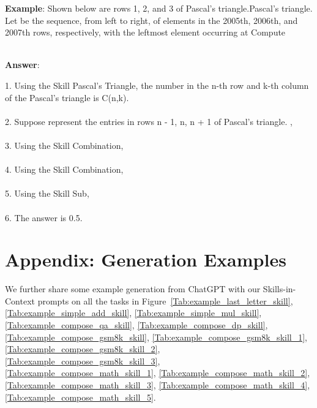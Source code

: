 \documentclass{article} \usepackage{arxiv}
\begin{document}
\begin{tcolorbox}[title = {An Example of Skill Composition for MATH}, colback = Apricot!25!white, colframe = BrickRed!75!black] 
\textbf{Example}: Shown below are rows 1, 2, and 3 of Pascal's triangle.Pascal's triangle. Let    be the sequence, from left to right, of elements in the 2005th, 2006th, and 2007th rows, respectively, with the leftmost element occurring at   Compute  \\ \\
 \quad

\textbf{Answer}:

1. Using the Skill Pascal's Triangle, the number in the n-th row and k-th column of the Pascal's triangle is C(n,k). \\ \\
2. Suppose  represent the entries in rows n - 1, n, n + 1 of Pascal's triangle. ,  \\ \\
3. Using the Skill Combination,  \\ \\
4. Using the Skill Combination,  \\ \\ 
5. Using the Skill Sub,  \\ \\
6. The answer is 0.5. 
\end{tcolorbox}
\noindent\begin{minipage}{\textwidth}   
 \label{Tab:compose_math_skill}
\end{minipage}



\newpage

\section{Appendix: Generation Examples} \label{Sec:examples}
We further share some example generation from ChatGPT with our Skills-in-Context prompts on all the tasks in Figure~\ref{Tab:example_last_letter_skill},\ref{Tab:example_simple_add_skill}, \ref{Tab:example_simple_mul_skill}, \ref{Tab:example_compose_qa_skill}, \ref{Tab:example_compose_dp_skill}, \ref{Tab:example_compose_gsm8k_skill}, \ref{Tab:example_compose_gsm8k_skill_1}, \ref{Tab:example_compose_gsm8k_skill_2}, \ref{Tab:example_compose_gsm8k_skill_3}, \ref{Tab:example_compose_math_skill_1}, \ref{Tab:example_compose_math_skill_2}, \ref{Tab:example_compose_math_skill_3}, \ref{Tab:example_compose_math_skill_4}, \ref{Tab:example_compose_math_skill_5}.
\end{document}
